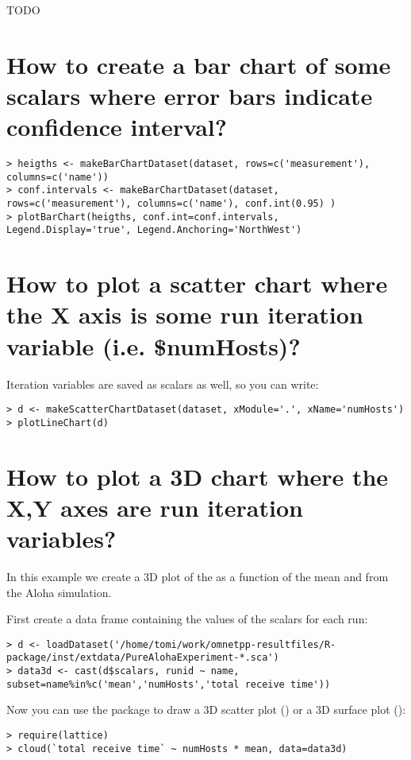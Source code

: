 TODO

\section{How to create a bar chart of some scalars where error bars indicate confidence interval?}

\begin{verbatim}
> heigths <- makeBarChartDataset(dataset, rows=c('measurement'), columns=c('name'))
> conf.intervals <- makeBarChartDataset(dataset, rows=c('measurement'), columns=c('name'), conf.int(0.95) )
> plotBarChart(heigths, conf.int=conf.intervals, Legend.Display='true', Legend.Anchoring='NorthWest')
\end{verbatim}

\section{How to plot a scatter chart where the X axis is some run iteration
variable (i.e. \$numHosts)?}

Iteration variables are saved as scalars as well, so you can write:

\begin{verbatim}
> d <- makeScatterChartDataset(dataset, xModule='.', xName='numHosts')
> plotLineChart(d)
\end{verbatim}

\section{How to plot a 3D chart where the X,Y axes are run iteration variables?}

In this example we create a 3D plot of the  as a function
of the mean  and  from the Aloha simulation.

First create a data frame containing the values of the scalars for each run:
 
\begin{verbatim}
> d <- loadDataset('/home/tomi/work/omnetpp-resultfiles/R-package/inst/extdata/PureAlohaExperiment-*.sca')
> data3d <- cast(d$scalars, runid ~ name, subset=name%in%c('mean','numHosts','total receive time'))
\end{verbatim}

Now you can use the  package to draw a 3D scatter plot () or a
3D surface plot ():

\begin{verbatim}
> require(lattice)
> cloud(`total receive time` ~ numHosts * mean, data=data3d)
\end{verbatim}



